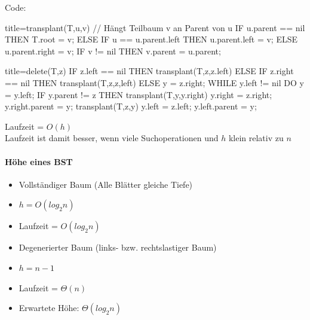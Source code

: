 \documentclass[
    ngerman,
    color=3b,
    load_common, %
    summary,
    boxarc,
]{tuda_summary}
\begin{document}
\clearpage
Code:
\begin{codeBlock}[autogobble]{title={transplant(T,u,v) // Hängt Teilbaum v an Parent von u}}
    IF u.parent == nil THEN
        T.root = v;
    ELSE
        IF u == u.parent.left THEN
            u.parent.left = v;
        ELSE
            u.parent.right = v;
    IF v != nil THEN
        v.parent = u.parent;
\end{codeBlock}
\begin{codeBlock}[autogobble]{title={delete(T,z)}}
    IF z.left == nil THEN
        transplant(T,z,z.left)
    ELSE
        IF z.right == nil THEN
            transplant(T,z,z,left)
        ELSE
            y = z.right;
            WHILE y.left != nil DO y = y.left;
            IF y.parent != z THEN
                transplant(T,y,y.right)
                y.right = z.right;
                y.right.parent = y;
            transplant(T,z,y)
            y.left = z.left;
            y.left.parent = y;
\end{codeBlock}
Laufzeit = $O(h)$\\
Laufzeit ist damit besser, wenn viele Suchoperationen und $h$ klein relativ zu $n$
\clearpage
\paragraph{Höhe eines BST}
\begin{description}[itemsep=1em]
    \item [Best Case]
          \begin{itemize}
              \item Vollständiger Baum (Alle Blätter gleiche Tiefe)
              \item $h = O(log_2 n)$
              \item Laufzeit = $O(log_2 n)$
          \end{itemize}
    \item [Worst Case]
          \begin{itemize}
              \item Degenerierter Baum (links- bzw. rechtslastiger Baum)
              \item $h = n - 1$
              \item Laufzeit = $\Theta(n)$
          \end{itemize}
    \item [Durchschnittliche Höhe]
          \begin{itemize}
              \item Erwartete Höhe: $\Theta(log_2 n)$
          \end{itemize}
\end{description}
\end{document}
